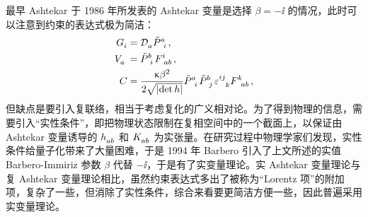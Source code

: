 		最早 Ashtekar 于 1986 年所发表的 Ashtekar 变量\cite{Ashtekar1986}是选择 $\beta = -\ii$ 的情况，此时可以注意到约束的表达式极为简洁：
		\begin{equation}
			\begin{split}
				\tensor{G}{_i} &= \AD{a} \tensor{\tilde{P}}{^a_i},\\
				\tensor{V}{_a} &= \tensor{\tilde{P}}{^b_i} \tensor{F}{^i_a_b},\\
				C &= \frac{\gkappa \beta^2}{2\sqrt{\abs{\det h}}} \tensor{\tilde{P}}{^a_i} \tensor{\tilde{P}}{^b_j} \tensor{\vol}{^i^j_k} \tensor{F}{^k_a_b},\label{eq-remannian_constrain}
			\end{split}
		\end{equation}
		但缺点是要引入复联络，相当于考虑复化的广义相对论。为了得到物理的信息，需要引入“实性条件”，即把物理状态限制在复相空间中的一个截面上，以保证由 Ashtekar 变量诱导的 $\tensor{h}{_a_b}$ 和 $\tensor{K}{_a_b}$ 为实张量。在研究过程中物理学家们发现，实性条件给量子化带来了大量困难，于是 1994 年 Barbero 引入了上文所述的实值 Barbero-Immiriz 参数 $\beta$ 代替 $-\ii$，于是有了实变量理论。实 Ashtekar 变量理论与复 Ashtekar 变量理论相比，虽然约束表达式多出了被称为“Lorentz 项”的附加项，复杂了一些，但消除了实性条件，综合来看要更简洁方便一些，因此普遍采用实变量理论。
